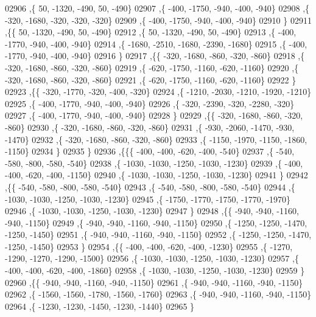 \begin{DoxyCode}
02906     ,\{    50, -1320,  -490,    50,  -490\}
02907     ,\{  -400, -1750,  -940,  -400,  -940\}
02908     ,\{  -320, -1680,  -320,  -320,  -320\}
02909     ,\{  -400, -1750,  -940,  -400,  -940\}
02910     \}
02911    ,\{\{    50, -1320,  -490,    50,  -490\}
02912     ,\{    50, -1320,  -490,    50,  -490\}
02913     ,\{  -400, -1770,  -940,  -400,  -940\}
02914     ,\{ -1680, -2510, -1680, -2390, -1680\}
02915     ,\{  -400, -1770,  -940,  -400,  -940\}
02916     \}
02917    ,\{\{  -320, -1680,  -860,  -320,  -860\}
02918     ,\{  -320, -1680,  -860,  -320,  -860\}
02919     ,\{  -620, -1750, -1160,  -620, -1160\}
02920     ,\{  -320, -1680,  -860,  -320,  -860\}
02921     ,\{  -620, -1750, -1160,  -620, -1160\}
02922     \}
02923    ,\{\{  -320, -1770,  -320,  -400,  -320\}
02924     ,\{ -1210, -2030, -1210, -1920, -1210\}
02925     ,\{  -400, -1770,  -940,  -400,  -940\}
02926     ,\{  -320, -2390,  -320, -2280,  -320\}
02927     ,\{  -400, -1770,  -940,  -400,  -940\}
02928     \}
02929    ,\{\{  -320, -1680,  -860,  -320,  -860\}
02930     ,\{  -320, -1680,  -860,  -320,  -860\}
02931     ,\{  -930, -2060, -1470,  -930, -1470\}
02932     ,\{  -320, -1680,  -860,  -320,  -860\}
02933     ,\{ -1150, -1970, -1150, -1860, -1150\}
02934     \}
02935    \}
02936   ,\{\{\{  -400,  -400,  -620,  -400,  -540\}
02937     ,\{  -540,  -580,  -800,  -580,  -540\}
02938     ,\{ -1030, -1030, -1250, -1030, -1230\}
02939     ,\{  -400,  -400,  -620,  -400, -1150\}
02940     ,\{ -1030, -1030, -1250, -1030, -1230\}
02941     \}
02942    ,\{\{  -540,  -580,  -800,  -580,  -540\}
02943     ,\{  -540,  -580,  -800,  -580,  -540\}
02944     ,\{ -1030, -1030, -1250, -1030, -1230\}
02945     ,\{ -1750, -1770, -1750, -1770, -1970\}
02946     ,\{ -1030, -1030, -1250, -1030, -1230\}
02947     \}
02948    ,\{\{  -940,  -940, -1160,  -940, -1150\}
02949     ,\{  -940,  -940, -1160,  -940, -1150\}
02950     ,\{ -1250, -1250, -1470, -1250, -1450\}
02951     ,\{  -940,  -940, -1160,  -940, -1150\}
02952     ,\{ -1250, -1250, -1470, -1250, -1450\}
02953     \}
02954    ,\{\{  -400,  -400,  -620,  -400, -1230\}
02955     ,\{ -1270, -1290, -1270, -1290, -1500\}
02956     ,\{ -1030, -1030, -1250, -1030, -1230\}
02957     ,\{  -400,  -400,  -620,  -400, -1860\}
02958     ,\{ -1030, -1030, -1250, -1030, -1230\}
02959     \}
02960    ,\{\{  -940,  -940, -1160,  -940, -1150\}
02961     ,\{  -940,  -940, -1160,  -940, -1150\}
02962     ,\{ -1560, -1560, -1780, -1560, -1760\}
02963     ,\{  -940,  -940, -1160,  -940, -1150\}
02964     ,\{ -1230, -1230, -1450, -1230, -1440\}
02965     \}

\end{DoxyCode}
